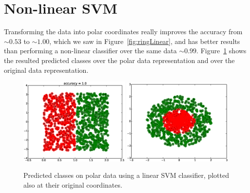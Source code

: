 \documentclass[a4paper,10pt]{article}
\begin{document}
\section{Non-linear SVM}
Transforming the data into polar coordinates really improves the accuracy from $\sim 0.53$ to $\sim 1.00$, which we saw in Figure~\ref{fig:ringLinear}, and has better results than performing a non-linear classifier over the same data $\sim 0.99$. Figure~\ref{fig:linearSVMonPolar} shows the resulted predicted classes over the polar data representation and over the original data representation.
\begin{figure}[ht!]
    \centering
    \includegraphics[width=0.49\textwidth]{linearSVMonPolar.eps}
    \includegraphics[width=0.49\textwidth]{final.eps}
    \caption{Predicted classes on polar data using a linear SVM classifier, plotted also at their original coordinates.}
    \label{fig:linearSVMonPolar}
\end{figure}
\end{document}

